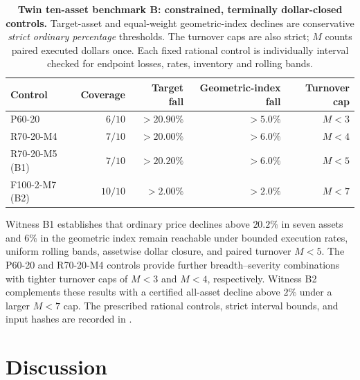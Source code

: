\documentclass[review,hidelinks,onefignum,onetabnum]{siamonline250211}
\begin{document}
\begin{table}[H]\centering\small
\caption{\textbf{Twin ten-asset benchmark B: constrained,
terminally dollar-closed controls.} Target-asset
and equal-weight geometric-index declines are
conservative \emph{strict ordinary percentage}
thresholds. The turnover caps are also strict;
$M$ counts paired executed dollars once.
Each fixed rational control is individually
interval checked for endpoint losses, rates,
inventory and rolling bands.}
\label{tab:twin-constrained}
\begin{tabular}{@{}lrrrr@{}}\toprule
Control & Coverage & Target fall & Geometric-index fall
  & Turnover cap\\\midrule
P60-20 & $6/10$ & $>20.90\%$ & $>5.0\%$ & $M<3$\\
R70-20-M4 & $7/10$ & $>20.00\%$ & $>6.0\%$ & $M<4$\\
R70-20-M5 (B1) & $7/10$ & $>20.20\%$ & $>6.0\%$ & $M<5$\\
F100-2-M7 (B2) & $10/10$ & $>2.00\%$ & $>2.0\%$ & $M<7$\\
\bottomrule\end{tabular}
\end{table}

Witness B1 establishes that ordinary price declines above
$20.2\%$ in seven assets and $6\%$ in the geometric index remain
reachable under bounded execution rates, uniform rolling bands,
assetwise dollar closure, and paired turnover $M<5$. The P60-20
and R70-20-M4 controls provide further breadth--severity combinations
with tighter turnover caps of $M<3$ and $M<4$, respectively.
Witness B2 complements these results with a certified all-asset
decline above $2\%$ under a larger $M<7$ cap.
The prescribed rational controls, strict interval bounds,
and input hashes are recorded in
.

\section{Discussion}\label{sec:discussion}
\end{document}
